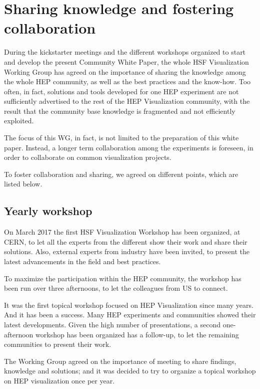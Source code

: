 \documentclass[12pt,a4paper]{article}
\begin{document}
\hypertarget{sharing-knowledge}{%
\section{Sharing knowledge and fostering collaboration}\label{sharing-knowledge}}

During the kickstarter meetings and the different workshops organized to start and develop the present Community White Paper,
the whole HSF Visualization Working Group has agreed on the importance of sharing the knowledge among the whole HEP community,
as well as the best practices and the know-how. Too often, in fact, solutions and tools developed for one HEP experiment are
not sufficiently advertised to the rest of the HEP Visualization community, with the result that the community base knowledge
is fragmented and not efficiently exploited.

The focus of this WG, in fact, is not limited to the preparation of this white paper. Instead, a longer term collaboration
among the experiments is foreseen, in order to collaborate on common visualization projects.

To foster collaboration and sharing, we agreed on different points, which are listed below.

\hypertarget{workshop}{%
\subsection{Yearly workshop}\label{workshop}}

On March 2017 the first HSF Visualization Workshop has been organized, at CERN, to let all the experts from the different
show their work and share their solutions. Also, external experts from industry have been invited, to present the latest
advancements in the field and best practices.

To maximize the participation within the HEP community, the workshop has been run over three afternoons, to let the
colleagues from US to connect.

It was the first topical workshop focused on HEP Visualization since many years. And it has been a success. Many HEP
experiments and communities showed their latest developments. Given the high number of presentations, a second one-afternoon
workshop has been organized has a follow-up, to let the remaining communities to present their work.

The Working Group agreed on the importance of meeting to share findings, knowledge and solutions; and it was decided to
try to organize a topical workshop on HEP visualization once per year.
\end{document}
